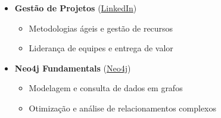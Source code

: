 \documentclass[a4paper]{article}
\begin{document}
\begin{itemize}[leftmargin=*]
    \item \textbf{Gestão de Projetos} (\href{https://www.linkedin.com/learning/certificates/0fc1a744c87dc72f53e8c694fd58809808a183327167377cb224c1ac43e732b6}{LinkedIn})
    \begin{itemize} \itemsep -1pt
        \item Metodologias ágeis e gestão de recursos
        \item Liderança de equipes e entrega de valor
    \end{itemize}
    
    \item \textbf{Neo4j Fundamentals} (\href{https://graphacademy.neo4j.com/c/9d25b259-5995-4053-8475-7b2bf61f163e/}{Neo4j})
    \begin{itemize} \itemsep -1pt
        \item Modelagem e consulta de dados em grafos
        \item Otimização e análise de relacionamentos complexos
    \end{itemize}
\end{itemize}
\end{document}
